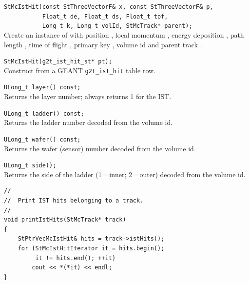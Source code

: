 \begin{Entry}
    \verb+StMcIstHit(const StThreeVectorF& x, const StThreeVectorF& p,+\\
    \verb+           Float_t de, Float_t ds, Float_t tof,+\\
    \verb+           Long_t k, Long_t volId, StMcTrack* parent);+\\
    Create an instance of  with position ,
    local momentum , energy deposition , path length
    , time of flight , primary key ,
    volume id  and parent track .

    \verb+StMcIstHit(g2t_ist_hit_st* pt);+\\
    Construct from a GEANT \texttt{g2t\_ist\_hit} table row.

\item[Public Member\\ Functions]

    \verb+ULong_t layer() const;+\\
    Returns the layer number; always returns 1 for the IST.

    \verb+ULong_t ladder() const;+\\
    Returns the ladder number decoded from the volume id.

    \verb+ULong_t wafer() const;+\\
    Returns the wafer (sensor) number decoded from the volume id.

    \verb+ULong_t side();+\\
    Returns the side of the ladder (1\,=\,inner; 2\,=\,outer) decoded
    from the volume id.

\item[Examples]
{\footnotesize
\begin{verbatim}
//
//  Print IST hits belonging to a track.
//
void printIstHits(StMcTrack* track)
{
    StPtrVecMcIstHit& hits = track->istHits();
    for (StMcIstHitIterator it = hits.begin();
         it != hits.end(); ++it)
        cout << *(*it) << endl;
}
\end{verbatim}
}%
\end{Entry}
\clearpage

%
%
